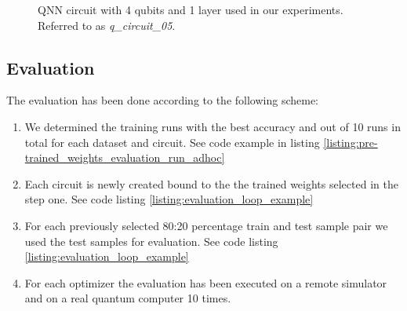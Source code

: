\begin{figure}[!h]
	\centering
	\caption{QNN circuit with 4 qubits and 1 layer used in our experiments. Referred to as \textit{q\_circuit\_05}.}
	\label{figure:qnn_quantum_circuit_05}
\end{figure}


\subsection{Evaluation}
\label{subsection:evaluation_runs}
The evaluation has been done according to the following scheme:

\begin{enumerate}
    \item We determined the training runs with the best accuracy and out of 10 runs in total for each dataset and circuit. See code example in listing \ref{listing:pre-trained_weights_evaluation_run_adhoc}
    \item Each circuit is newly created bound to the the trained weights selected in the step one. See code listing \ref{listing:evaluation_loop_example}
    \item For each previously selected 80:20 percentage train and test sample pair we used the test samples for evaluation. See code listing \ref{listing:evaluation_loop_example}
    \item For each optimizer the evaluation has been executed on a remote simulator and on a real quantum computer 10 times.
\end{enumerate}

